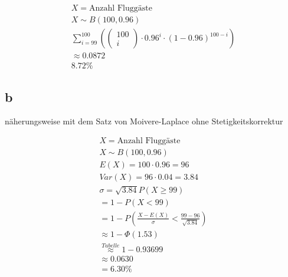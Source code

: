 \begin{align*}
    X = \text{Anzahl Fluggäste}                                                              \\
    X \sim B(100, 0.96)                                                                      \\
    \sum_{i = 99}^{100} \left(\begin{pmatrix}
                                      100 \\ i
                                  \end{pmatrix} \cdot 0.96^i \cdot {(1 - 0.96)}^{100 - i}\right) \\
    \approx 0.0872                                                                           \\
    8.72\%
\end{align*}

\subsection{b}

näherungsweise mit dem Satz von Moivere-Laplace ohne Stetigkeitskorrektur

\begin{align*}
    X = \text{Anzahl Fluggäste}                                               \\
    X \sim B(100, 0.96)                                                       \\
    E(X) = 100 \cdot 0.96 = 96                                                \\
    Var(X) = 96 \cdot 0.04 = 3.84                                             \\
    \sigma = \sqrt{3.84}
    P(X \geq 99)                                                              \\
    = 1 - P(X < 99)                                                           \\
    = 1 - P\left(\frac{X - E(X)}{\sigma} < \frac{99 - 96}{\sqrt{3.84}}\right) \\
    \approx 1 - \Phi(1.53)                                                    \\
    \overset{Tabelle}{\approx} 1 - 0.93699                                    \\
    \approx 0.0630                                                            \\
    = 6.30\%
\end{align*}

